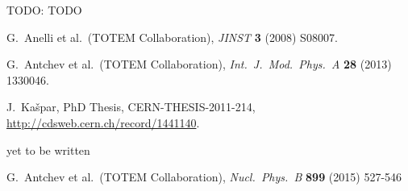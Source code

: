 \documentclass[TOTEM]{cern/cernphprep}
\def\etal{et al.}
\def\TODO#1{{\color{red}TODO: #1}}
\def\Name#1{#1, }
\def\Review#1#2#3#4{{\it #1} {\bf #2} (#3) #4}
\def\hang{\hangindent=\parindent}
\def\>{\par\vskip\itskip\parindent\itindent\indent\hang\llap{\hbox to3mm{$\bullet$\hss}}}
\def\>E{\par\vskip\itskip\parindent\itindent\indent\hang\llap{\hbox to3mm{\hss}}}
\def\>>{\par\vskip\iitskip\parindent\iitindent\indent\hang\llap{\hbox to\iitindent{\hss--\ }}}
\begin{document}
\> \TODO{TODO}


\begin{thebibliography}{99}

	\Name{G.~Anelli \etal{}~(TOTEM Collaboration)}
	\Review{JINST}{3}{2008}{S08007}.

	\Name{G.~Antchev \etal{}~(TOTEM Collaboration)}
	\Review{Int.~J.~Mod.~Phys.~A}{28}{2013}{1330046}.

	\Name{J.~Ka\v spar}
	PhD Thesis, CERN-THESIS-2011-214,
	\url{http://cdsweb.cern.ch/record/1441140}.

	yet to be written

	\Name{G.~Antchev \etal{}~(TOTEM Collaboration)}
	\Review{Nucl.~Phys.~B}{899}{2015}{527-546}

\end{thebibliography}
\end{document}
